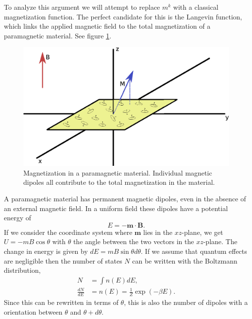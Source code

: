 \noindent To analyze this argument we will attempt to replace $m^k$ with a classical magnetization function. The perfect candidate for this is the Langevin function, which links the applied magnetic field to the total magnetization of a paramagnetic material. See figure \ref{fig:paramag}. 
\begin{figure}[hb]
    \centering
    \includegraphics[width=\textwidth]{figures/chapter3/paramagnetism.eps}
    \caption{Magnetization in a paramagnetic material. Individual magnetic dipoles all contribute to the total magnetization in the material.}
    \label{fig:paramag}
\end{figure}
A paramagnetic material has permanent magnetic dipoles, even in the absence of an external magnetic field. In a uniform field these dipoles have a potential energy of
\begin{equation*}
    E = -\mathbf{m}\cdot\mathbf{B}.
\end{equation*}
If we consider the coordinate system where $\mathbf{m}$ lies in the $xz$-plane, we get $U = -mB \cos{\theta}$ with $\theta$ the angle between the two vectors in the $xz$-plane. The change in energy is given by $dE = mB\sin{\theta}d\theta$. If we assume that quantum effects are negligible then the number of states $N$ can be written with the Boltzmann distribution,
\begin{align*}
    N &= \int n(E) dE,\\
    \frac{dN}{dE} &= n(E) = \frac{1}{Z} \exp(-\beta E).
\end{align*}
Since this can be rewritten in terms of $\theta$, this is also the number of dipoles with a orientation between $\theta$ and $\theta+d\theta$. \newline

